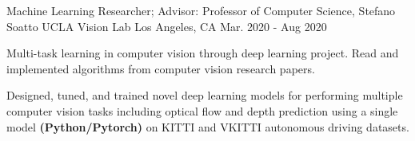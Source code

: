 \cventry
    {Machine Learning Researcher; Advisor: Professor of Computer Science, Stefano Soatto} %
    {UCLA Vision Lab} %
    {Los Angeles, CA} %
    {Mar. 2020 - Aug 2020} %
    {
      \begin{cvitems} %
        \item {Multi-task learning in computer vision through deep learning project. 
            Read and implemented algorithms from computer vision research papers. 
        }
        \item {  
        Designed, tuned, and trained novel deep learning models for performing 
        multiple computer vision tasks including optical flow and depth prediction
        using a single model \textbf{(Python/Pytorch)} on KITTI and VKITTI autonomous driving 
        datasets.
        }
      \end{cvitems}
    } 